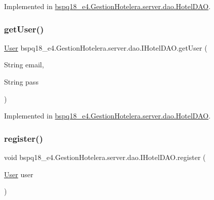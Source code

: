 Implemented in \mbox{\hyperlink{classbspq18__e4_1_1_gestion_hotelera_1_1server_1_1dao_1_1_hotel_d_a_o_a9f7f21df7f6f48a54c6762d887741892}{bspq18\+\_\+e4.\+Gestion\+Hotelera.\+server.\+dao.\+Hotel\+D\+AO}}.

\mbox{\label{interfacebspq18__e4_1_1_gestion_hotelera_1_1server_1_1dao_1_1_i_hotel_d_a_o_a1de8539206849f50aa8893686acd009d}} 
\subsubsection{\texorpdfstring{get\+User()}{getUser()}}
{\footnotesize\ttfamily \mbox{\hyperlink{classbspq18__e4_1_1_gestion_hotelera_1_1server_1_1data_1_1_user}{User}} bspq18\+\_\+e4.\+Gestion\+Hotelera.\+server.\+dao.\+I\+Hotel\+D\+A\+O.\+get\+User (\begin{DoxyParamCaption}\item[{String}]{email,  }\item[{String}]{pass }\end{DoxyParamCaption})}



Implemented in \mbox{\hyperlink{classbspq18__e4_1_1_gestion_hotelera_1_1server_1_1dao_1_1_hotel_d_a_o_a0b26b5999cd9192cba1d5c1381f896e3}{bspq18\+\_\+e4.\+Gestion\+Hotelera.\+server.\+dao.\+Hotel\+D\+AO}}.

\mbox{\label{interfacebspq18__e4_1_1_gestion_hotelera_1_1server_1_1dao_1_1_i_hotel_d_a_o_a9756103fe06e2238d0a3454b09c92145}} 
\subsubsection{\texorpdfstring{register()}{register()}}
{\footnotesize\ttfamily void bspq18\+\_\+e4.\+Gestion\+Hotelera.\+server.\+dao.\+I\+Hotel\+D\+A\+O.\+register (\begin{DoxyParamCaption}\item[{\mbox{\hyperlink{classbspq18__e4_1_1_gestion_hotelera_1_1server_1_1data_1_1_user}{User}}}]{user }\end{DoxyParamCaption})}




